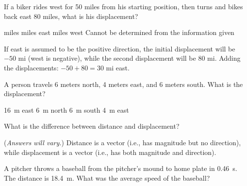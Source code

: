 \documentclass[]{exam}
\begin{document}
\begin{questions}


\question
If a biker rides west for 50 miles from his starting position, then turns and bikes back east 80 miles, what is his displacement?

\begin{choices}
 miles
 miles east
 miles west
\choice Cannot be determined from the information given
\end{choices}

\begin{solution}
If east is assumed to be the positive direction, the initial displacement will be $-50$ mi (west is negative), while the second displacement will be 80 mi. Adding the displacements: $-50 + 80 = 30$ mi east.
\end{solution}

\question
A person travels 6 meters north, 4 meters east, and 6 meters south. What is the displacement?

\begin{choices}
\choice \SI{16}{\meter} east
\choice \SI{6}{\meter} north
\choice \SI{6}{\meter} south
\CorrectChoice \SI{4}{\meter} east
\end{choices}

\question %
What is the difference between distance and displacement?

\begin{solution}
(\textit{Answers will vary.}) Distance is a vector (i.e., has magnitude but no direction), while displacement is a vector (i.e., has both magnitude and direction).
\end{solution}



\question
A pitcher throws a baseball from the pitcher's mound to home plate in \SI{0.46}{s}. The distance is \SI{18.4}{m}. What was the average speed of the baseball?


\end{questions}
\end{document}
